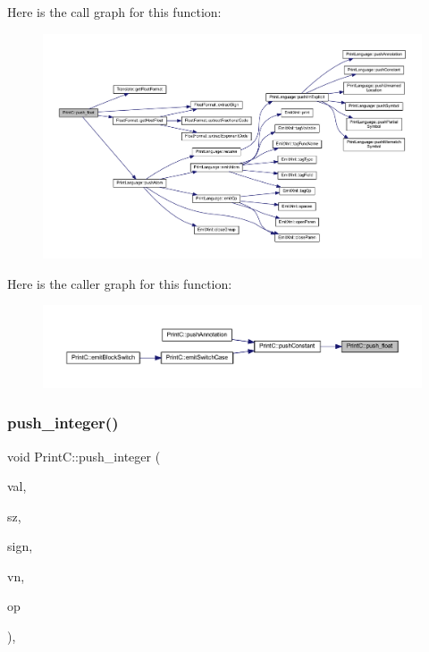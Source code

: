 Here is the call graph for this function\+:
\nopagebreak
\begin{figure}[H]
\begin{center}
\leavevmode
\includegraphics[width=350pt]{class_print_c_a5770972840193a1f118925fbb92fa4b2_cgraph}
\end{center}
\end{figure}
Here is the caller graph for this function\+:
\nopagebreak
\begin{figure}[H]
\begin{center}
\leavevmode
\includegraphics[width=350pt]{class_print_c_a5770972840193a1f118925fbb92fa4b2_icgraph}
\end{center}
\end{figure}
\mbox{\label{class_print_c_aa85a02ccc13756ecac61350ffd409e80}} 
\subsubsection{\texorpdfstring{push\_integer()}{push\_integer()}}
{\footnotesize\ttfamily void Print\+C\+::push\+\_\+integer (\begin{DoxyParamCaption}\item[{\mbox{\hyperlink{types_8h_a2db313c5d32a12b01d26ac9b3bca178f}{uintb}}}]{val,  }\item[{int4}]{sz,  }\item[{bool}]{sign,  }\item[{const \mbox{\hyperlink{class_varnode}{Varnode}} $\ast$}]{vn,  }\item[{const \mbox{\hyperlink{class_pcode_op}{Pcode\+Op}} $\ast$}]{op }\end{DoxyParamCaption})\hspace{0.3cm}{\ttfamily [protected]}, {\ttfamily [virtual]}}



